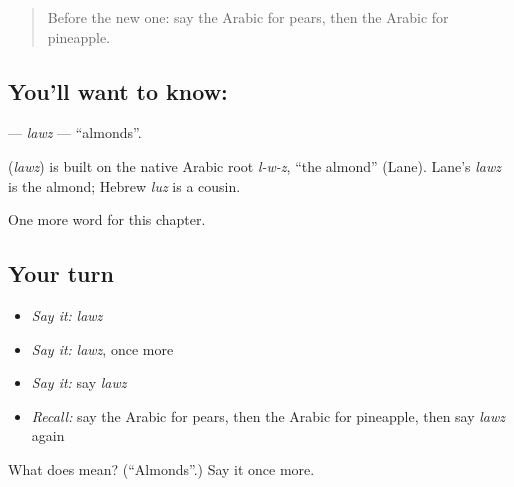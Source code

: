 \label{lesson:AR-C244-lawz}



\begin{quote}
Before the new one: say the Arabic for pears, then the Arabic for pineapple.
\end{quote}

\subsection*{You'll want to know: }
\textbf{} — \emph{lawz} — \textquotedblleft{}almonds\textquotedblright{}.

\begin{cousinweb}
\textbf{} (\emph{lawz}) is built on the native Arabic root \emph{l-w-z}, \textquotedblleft{}the almond\textquotedblright{} (Lane). Lane's \emph{lawz} is the almond; Hebrew \emph{luz} is a cousin.
\end{cousinweb}

\begin{grammarlens}[title={What you've built}]
One more word for this chapter.
\end{grammarlens}

\subsection*{Your turn}
\begin{itemize}
\raggedright
  \item \emph{Say it:} \emph{lawz}
  \item \emph{Say it:} \emph{lawz}, once more
  \item \emph{Say it:} say \emph{lawz}
  \item \emph{Recall:} say the Arabic for pears, then the Arabic for pineapple, then say \emph{lawz} again
\end{itemize}

\begin{tcolorbox}[breakable,colback=teal!4,colframe=teal!35!black,title={Before you move on}]
What does  mean? (\textquotedblleft{}Almonds\textquotedblright{}.) Say it once more.
\end{tcolorbox}

